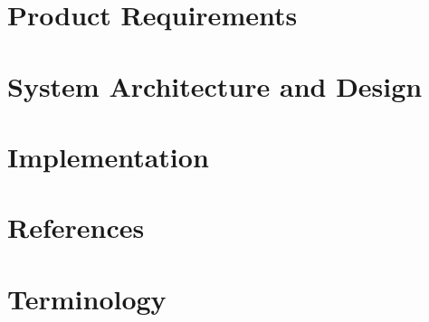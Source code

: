 \documentclass[hidelinks]{report}
\begin{document}
	\maketitle
	\tableofcontents
	
	\chapter{Product Requirements}\label{chp:requirements}
	\thispagestyle{fancy}
	
	
	\chapter{System Architecture and Design}\label{chp:design}
	\thispagestyle{fancy}
	
	
	\chapter{Implementation}\label{chp:implementation}
	\thispagestyle{fancy}
	
	
	\chapter{References}\label{chp:references}
	\thispagestyle{fancy}
	
	
	\chapter{Terminology}\label{chp:terminology}
	\thispagestyle{fancy}
	



\end{document}
